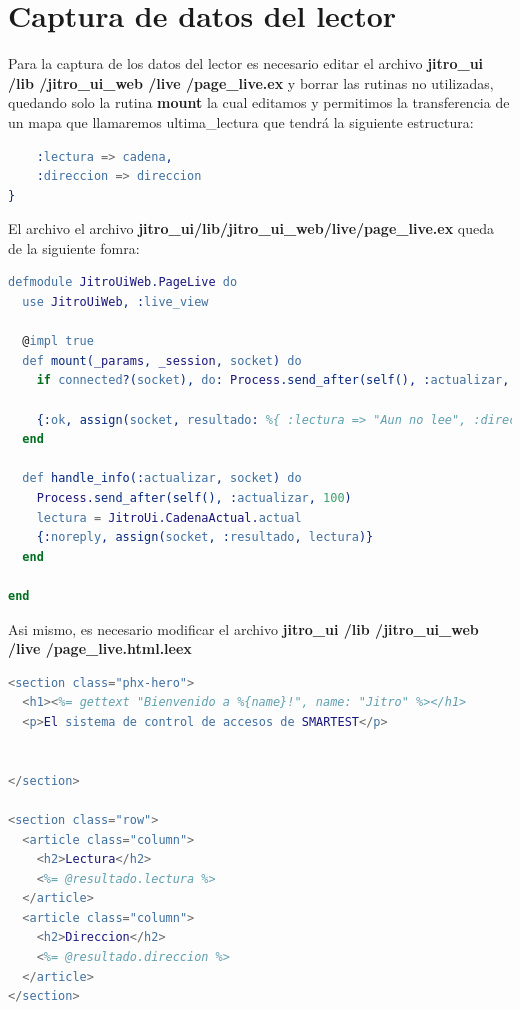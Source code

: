 \section{Captura de datos del lector}

Para la captura de los datos del lector es necesario editar el archivo \textbf{jitro\_ui /lib /jitro\_ui\_web /live /page\_live.ex} y borrar las rutinas no utilizadas, quedando solo la rutina \textbf{mount} la cual editamos y permitimos la transferencia de un mapa que llamaremos ultima\_lectura que tendrá la siguiente estructura:

\begin{lstlisting}[language=erlang]
%{
	:lectura => cadena,
	:direccion => direccion
}
\end{lstlisting}

El archivo el archivo \textbf{jitro\_ui/lib/jitro\_ui\_web/live/page\_live.ex} queda de la siguiente fomra:

\begin{lstlisting}[language=erlang]
defmodule JitroUiWeb.PageLive do
  use JitroUiWeb, :live_view

  @impl true
  def mount(_params, _session, socket) do
    if connected?(socket), do: Process.send_after(self(), :actualizar, 100)

    {:ok, assign(socket, resultado: %{ :lectura => "Aun no lee", :direccion => "Sin direccion"})}
  end

  def handle_info(:actualizar, socket) do
    Process.send_after(self(), :actualizar, 100)
    lectura = JitroUi.CadenaActual.actual
    {:noreply, assign(socket, :resultado, lectura)}
  end

end
\end{lstlisting}

Asi mismo, es necesario modificar el archivo \textbf{jitro\_ui /lib /jitro\_ui\_web /live /page\_live.html.leex}

\begin{lstlisting}[language=erlang]
<section class="phx-hero">
  <h1><%= gettext "Bienvenido a %{name}!", name: "Jitro" %></h1>
  <p>El sistema de control de accesos de SMARTEST</p>


</section>

<section class="row">
  <article class="column">
    <h2>Lectura</h2>
    <%= @resultado.lectura %> 
  </article>
  <article class="column">
    <h2>Direccion</h2>
    <%= @resultado.direccion %>
  </article>
</section>
\end{lstlisting}


